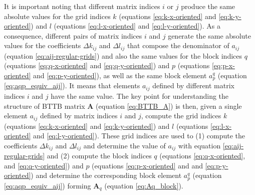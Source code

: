 It is important noting that different matrix indices $i$ or $j$ produce the same 
absolute values for the grid indices $k$ (equations \ref{eq:k-x-oriented} and
\ref{eq:k-y-oriented}) and $l$ (equations \ref{eq:l-x-oriented} and
\ref{eq:l-y-oriented}). As a consequence, different pairs of matrix indices $i$
and $j$ generate the same absolute values for the coefficients $\Delta k_{ij}$ and
$\Delta l_{ij}$ that compose the denominator of $a_{ij}$ 
(equation \ref{eq:aij-regular-grids}) and also the same values for the block indices
$q$ (equations \ref{eq:q-x-oriented} and \ref{eq:q-y-oriented}) and 
$p$ (equations \ref{eq:p-x-oriented} and \ref{eq:p-y-oriented}), as well as the same
block element $a^{q}_{p}$ (equation \ref{eq:aqp_equiv_aij}). 
It means that elements $a_{ij}$ defined
by different matrix indices $i$ and $j$ have the same value. The key point for
understanding the structure of BTTB matrix $\mathbf{A}$ (equation \ref{eq:BTTB_A})
is then, given a single element $a_{ij}$
defined by matrix indices $i$ and $j$, compute the grid indices 
$k$ (equations \ref{eq:k-x-oriented} and \ref{eq:k-y-oriented}) and
$l$ (equations \ref{eq:l-x-oriented} and \ref{eq:l-y-oriented}).
These grid indices are used to 
(1) compute the coefficients $\Delta k_{ij}$ and 
$\Delta l_{ij}$ and determine the value of $a_{ij}$ with equation 
\ref{eq:aij-regular-grids} and 
(2) compute the block indices $q$ (equations \ref{eq:q-x-oriented}, 
and \ref{eq:q-y-oriented}) and $p$ (equations \ref{eq:p-x-oriented} and
and \ref{eq:p-y-oriented}) and determine the corresponding block element $a^{q}_{p}$ 
(equation \ref{eq:aqp_equiv_aij}) forming $\mathbf{A}_{q}$ (equation \ref{eq:Aq_block}). 

